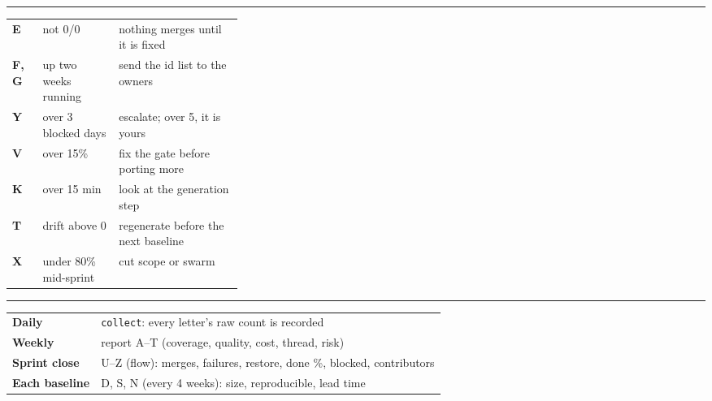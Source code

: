 \documentclass[letterpaper]{article}
\newcommand{\head}[1]{\par\vspace{7pt}{\sffamily\bfseries\large #1}\par\vspace{1pt}\hrule\vspace{4pt}}
\begin{document}
\begin{multicols}{2}
\par
\head{Act when\ldots}
{\small\begin{tabularx}{\linewidth}{@{}>{\sffamily\bfseries}l >{\raggedright\arraybackslash}p{0.33\linewidth} >{\raggedright\arraybackslash}X@{}}
E & not 0/0 & nothing merges until it is fixed\\
F, G & up two weeks running & send the id list to the owners\\
Y & over 3 blocked days & escalate; over 5, it is yours\\
V & over 15\% & fix the gate before porting more\\
K & over 15 min & look at the generation step\\
T & drift above 0 & regenerate before the next baseline\\
X & under 80\% mid-sprint & cut scope or swarm\\
\end{tabularx}}
\head{When each letter changes}
{\small\begin{tabularx}{\linewidth}{@{}>{\bfseries}l X@{}}
Daily & \texttt{collect}: every letter's raw count is recorded\\
Weekly & report A--T (coverage, quality, cost, thread, risk)\\
Sprint close & U--Z (flow): merges, failures, restore, done \%, blocked, contributors\\
Each baseline & D, S, N (every 4 weeks): size, reproducible, lead time\\
\end{tabularx}}
\end{multicols}
\end{document}
